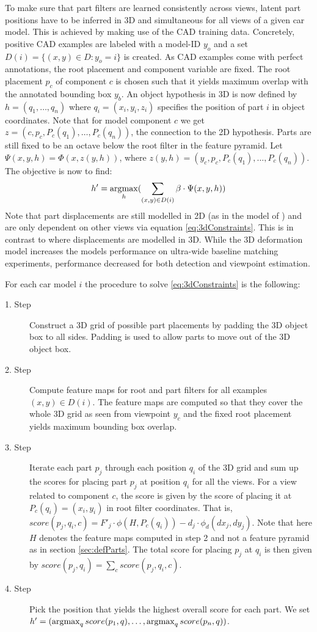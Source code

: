 To make sure that part filters are learned consistently across views, latent part positions have to be inferred in 3D and simultaneous for all views of a given car model. This is achieved by making use of the CAD training data. Concretely, positive CAD examples are labeled with a model-ID $y_o$ and  a set $D(i)=\{(x,y)\in D:y_o=i\}$ is created. As CAD examples come with perfect annotations, the root placement and component variable are fixed. The root placement $p_c$ of component $c$ is chosen such that it yields maximum overlap with the annotated bounding box $y_b$. An object hypothesis in 3D is now defined by $h=(q_1,\ldots,q_n)$ where $q_i=(x_i,y_i,z_i)$ specifies the position of part $i$ in object coordinates. Note that for model component $c$ we get $z=(c,p_c,P_c(q_1),\ldots,P_c(q_n))$, the connection to the 2D hypothesis. Parts are still fixed to be an octave below the root filter in the feature pyramid. Let $\Psi(x,y,h)=\Phi(x,z(y,h))$, where $z(y,h)=(y_c,p_c,P_c(q_1),\ldots,P_c(q_n))$. The objective is now to find:
\begin{equation}\label{eq:3dConstraints}
	h'=\operatorname*{\arg\!\max}_{h}(\sum_{(x,y)\in D(i)}\beta\cdot\Psi(x,y,h))
\end{equation}
Note that part displacements are still modelled in 2D (as in the model of \cite{6248075}) and are only dependent on other views via equation \ref{eq:3dConstraints}. This is in contrast to \cite{Pepik:2012aa} where displacements are modelled in 3D. While the 3D deformation model increases the models performance on ultra-wide baseline matching experiments, performance decreased for both detection and viewpoint estimation.

For each car model $i$ the procedure to solve \ref{eq:3dConstraints} is the following:
\begin{description}
  \item[1. Step]  Construct a 3D grid of possible part placements by padding the 3D object box to all sides. Padding is used to allow parts to move out of the 3D object box. 
  \item[2. Step] Compute feature maps for root and part filters for all examples $(x,y)\in D(i)$. The feature maps are computed so that they cover the whole 3D grid as seen from viewpoint $y_c$ and the fixed root placement yields maximum bounding box overlap.
  \item[3. Step] Iterate each part $p_j$ through each position $q_i$ of the 3D grid and sum up the scores for placing part $p_j$ at position $q_i$ for all the views. For a view related to component $c$, the score is given by  the score of placing it at $P_c(q_i)=(x_i,y_i)$ in root filter coordinates. That is, $score(p_j,q_i,c)=F'_j\cdot \phi(H,P_c(q_i))-d_j\cdot \phi_d (dx_j,dy_j)$. Note that here $H$ denotes the feature maps computed in step 2 and not a feature pyramid as in section \ref{sec:defParts}. The total score for placing $p_j$ at $q_i$ is then given by $score(p_j,q_i)=\sum_cscore(p_j,q_i,c)$.
  \item[4. Step] Pick the position that yields the highest overall score for each part. We set $h'=(\operatorname*{\arg\!\max}_{q}score(p_1,q),\ldots,\operatorname*{\arg\!\max}_{q}score(p_n,q))$.
\end{description}

